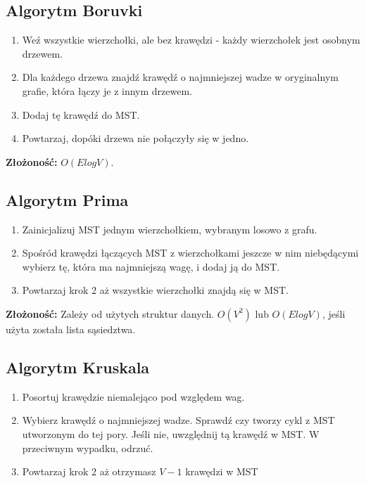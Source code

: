 \documentclass[main.tex]{subfiles}
\begin{document}
    \subsection{Algorytm Boruvki}
    \begin{enumerate}
        \item Weź wszystkie wierzchołki, ale bez krawędzi - każdy wierzchołek jest osobnym drzewem.
        \item Dla każdego drzewa znajdź krawędź o najmniejszej wadze w oryginalnym grafie, która łączy je z innym drzewem.
        \item Dodaj tę krawędź do MST.
        \item Powtarzaj, dopóki drzewa nie połączyły się w jedno.
    \end{enumerate}
    \textbf{Złożoność:} $O(ElogV)$.


    \subsection{Algorytm Prima}
    \begin{enumerate}
        \item Zainicjalizuj MST jednym wierzchołkiem, wybranym losowo z grafu.
        \item Spośród krawędzi łączących MST z wierzchołkami jeszcze w nim niebędącymi wybierz tę, która ma najmniejszą wagę, i dodaj ją do MST.
        \item Powtarzaj krok 2 aż wszystkie wierzchołki znajdą się w MST.
    \end{enumerate}
    \textbf{Złożoność:} Zależy od użytych struktur danych. $O(V^2)$ lub $O(ElogV)$, jeśli użyta została lista sąsiedztwa.



    \subsection{Algorytm Kruskala}

    \begin{enumerate}
        \item Posortuj krawędzie niemalejąco pod względem wag.
        \item Wybierz krawędź o najmniejszej wadze. Sprawdź czy tworzy cykl z MST utworzonym do tej pory. Jeśli nie, uwzględnij tą krawędź w MST. W przeciwnym wypadku, odrzuć.
        \item Powtarzaj krok 2 aż otrzymasz $V-1$ krawędzi w MST
    \end{enumerate}
\end{document}
